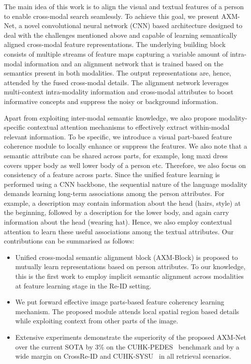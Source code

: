 \documentclass[letterpaper]{article} \usepackage{aaai22}  \usepackage{times}  \usepackage{helvet}  \usepackage{courier}  \usepackage[hyphens]{url}  \usepackage{graphicx} \urlstyle{rm} \def\UrlFont{\rm}  \usepackage{natbib}  \usepackage{caption} \DeclareCaptionStyle{ruled}{labelfont=normalfont,labelsep=colon,strut=off} \frenchspacing  \setlength{\pdfpagewidth}{8.5in}  \setlength{\pdfpageheight}{11in}  \usepackage{algorithm}
\begin{document}
The main idea of this work is to align the visual and textual features of a person to enable cross-modal search seamlessly. To achieve this goal, we present AXM-Net, a novel convolutional neural network (CNN) based architecture designed to deal with the challenges mentioned above and capable of learning semantically aligned cross-modal feature representations. The underlying building block consists of multiple streams of feature maps capturing a variable amount of intra-modal information and an alignment network that is trained based on the semantics present in both modalities. The output representations are, hence, attended by the fused cross-modal details. The alignment network leverages multi-context intra-modality information and cross-modal attributes to boost informative concepts and suppress the noisy or background information.
 
 Apart from exploiting inter-modal semantic knowledge, we also propose modality-specific contextual attention mechanisms to effectively extract within-modal relevant information. To be specific, we introduce a visual part-based feature coherence module to locally enhance or suppress the features. We also note that a semantic attribute can be shared across parts, for example, long maxi dress covers upper body as well lower body of a person etc. Therefore, we also focus on consistency of a feature across parts. Since the unified feature learning is performed using a CNN backbone, the sequential nature of the language modality demands learning long-term associations among the person attributes. For example, a description may contain information about the head (hairs, style) at the beginning, followed by a description for the lower body, and again carry information about the head (wearing hat). Hence, we also employ contextual attention to learn these useful associations among the textual attributes.
 Our contributions can be summarised as follows:
 \begin{itemize}
     \item Unified cross-modal semantic alignment block (AXM-Block) is proposed to mutually learn representations based on person attributes. To our knowledge, this is the first work to employ implicit semantic alignment across modalities at feature learning stage in the Re-ID setting.
     
     \item We put forward effective image parts-based feature coherency learning mechanism. The proposed module attends local spatial region based details while exploiting context from other parts of the image.
     
     \item Extensive experiments demonstrate the superiority 
     of the proposed AXM-Net over the current SOTA by 3\% on the CUHK-PEDES~\cite{li2017person} benchmark and by a wide margin on CrossRe-ID and CUHK-SYSU~\cite{farooq2020convolutional,farooq2020IJCB} in all retrieval scenarios.
 \end{itemize}
\end{document}
